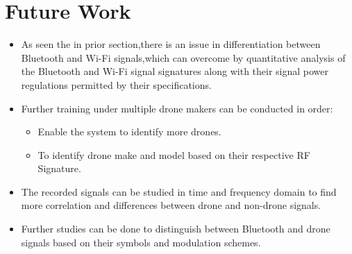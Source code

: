 \section{Future Work}\label{Future Work}
\begin{itemize}

  \item As seen the in prior section,there is an issue in differentiation between Bluetooth and Wi-Fi signals,which can overcome by quantitative analysis of the Bluetooth and Wi-Fi signal signatures along with their signal power regulations permitted by their specifications.
  \item Further training under multiple drone makers can be conducted in order:
    \begin{itemize}
      \item Enable the system to identify more drones.
      \item To identify drone make and model based on their respective RF Signature.
    \end{itemize}
  \item The recorded signals can be studied  in time and frequency domain to find more correlation and differences between drone and non-drone signals.
  \item Further studies can be done to distinguish between Bluetooth and drone signals based on their symbols and modulation schemes.
\end{itemize}
